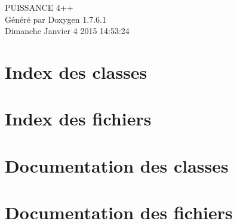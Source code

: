 \documentclass[a4paper]{book}
\begin{document}
\hypersetup{pageanchor=false,citecolor=blue}
\begin{titlepage}
\vspace*{7cm}
\begin{center}
{\Large \-P\-U\-I\-S\-S\-A\-N\-C\-E 4++ }\\
\vspace*{1cm}
{\large \-Généré par Doxygen 1.7.6.1}\\
\vspace*{0.5cm}
{\small Dimanche Janvier 4 2015 14:53:24}\\
\end{center}
\end{titlepage}
\clearemptydoublepage
{}
\tableofcontents
\clearemptydoublepage
{}
\hypersetup{pageanchor=true,citecolor=blue}
\chapter{\-Index des classes}

\chapter{\-Index des fichiers}

\chapter{\-Documentation des classes}


\chapter{\-Documentation des fichiers}

















\printindex
\end{document}
